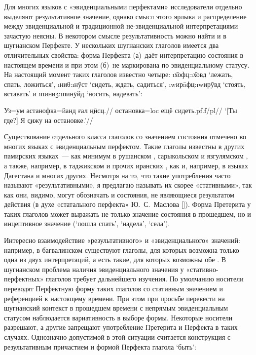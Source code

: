 {{{Для многих языков с «эвиденциальными перфектами» исследователи отдельно выделяют результативное значение, однако смысл этого ярлыка и распределение между эвиденциальной и традиционной не-эвиденциальной интерпретациями зачастую неясны. В некотором смысле результативность можно найти и в шугнанском Перфекте. У нескольких шугнанских глаголов имеется два отличительных свойства: форма Перфекта (а)~даёт интерпретацию состояния в настоящем времени и при этом (б)~не маркирована по эвиденциальному статусу. На настоящий момент таких глаголов известно четыре: \i{х̌офц}:\i{х̌овд} ‘лежать, спать, ложиться’, \i{ниθ}:\i{нӯст} ‘сидеть, ждать, садиться’, \i{wирāфц}:\i{wирӯвд} ‘стоять, вставать’ и \i{пиниӡ}:\i{пинӯйд} ‘носить, надевать’:

\begingl
\gla Уз=ум астанофка=йанд ғал \b{нӣсц}.//
 остановка={\sc loc} ещё сидеть.{\sc pf.f/pl}//
\glft ‘[Ты где?] Я \b{сижу} на остановке.’//
\endgl \xe

Существование отдельного класса глаголов со значением состояния отмечено во многих языках с эвиденциальным перфектом. Такие глаголы известны в других памирских языках~— как минимум в рушанском \parencite[112]{fayzov1966}, сарыкольском \parencite[92]{palmer2016} и язгулямском \parencite[57]{edelman1966}, а также, например, в таджикском \parencite[221–223]{perry2005} и прочих иранских \parencite[292–293]{jugel2020}, как и, например, в языках Дагестана \parencites[450]{tatevosov2001}[70]{verhees2019} и многих других. Несмотря на то, что такие употребления часто называют «результативными», я предлагаю называть их скорее «стативными», так как они, видимо, могут обозначать и состояния, не являющиеся результатом действия (в духе «статального перфекта» Ю.~С.~Маслова [\cite*[42]{maslov1983}]). Форма Претерита у таких глаголов может выражать не только значение состояния в прошедшем, но и инцептивное значение (‘пошла спать’, ‘надела’, ‘села’).

Интересно взаимодействие «результативного» и «эвиденциального» значений: например, в багвалинском существуют глаголы, для которых возможна только одна из двух интерпретаций, а есть такие, для которых возможны обе \parencite[355–357]{tatevosov2007}. В шугнанском проблема наличия эвиденциального значения у «стативно-перфектных» глаголов требует дальнейшего изучения. По умолчанию носители переводят Перфектную форму таких глаголов со стативным значением и референцией к настоящему времени. При этом при просьбе перевести на шугнанский контекст в прошедшем времени с непрямым эвиденциальным статусом наблюдается вариативность в выборе формы. Некоторые носители разрешают, а другие запрещают употребление Претерита и Перфекта в таких случаях. Однозначно допустимой в этой ситуации считается конструкция с результативным причастием и формой Перфекта глагола ‘быть’:

}}}
